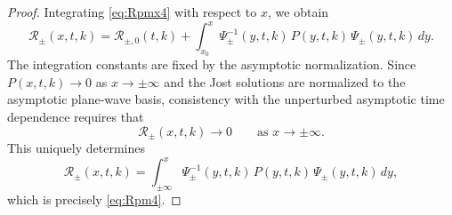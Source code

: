 \documentclass[10pt,a4paper]{amsart}
\begin{document}
\begin{proof}
Integrating \eqref{eq:Rpmx4} with respect to $x$, we obtain
\[
\mathcal{R}_\pm(x,t,k)=\mathcal{R}_{\pm,0}(t,k)+\int_{x_0}^{x}\Psi_\pm^{-1}(y,t,k)\,P(y,t,k)\,\Psi_\pm(y,t,k)\,dy.
\]
The integration constants are fixed by the asymptotic normalization. Since $P(x,t,k)\to 0$ as $x\to\pm\infty$ and the Jost solutions are normalized to the asymptotic plane-wave basis, consistency with the unperturbed asymptotic time dependence requires that
\[
\mathcal{R}_\pm(x,t,k)\to 0
\qquad\text{as }x\to\pm\infty.
\]
This uniquely determines
\[
\mathcal{R}_\pm(x,t,k)=\int_{\pm\infty}^{x}\Psi_\pm^{-1}(y,t,k)\,P(y,t,k)\,\Psi_\pm(y,t,k)\,dy,
\]
which is precisely \eqref{eq:Rpm4}.
\end{proof}
\end{document}
